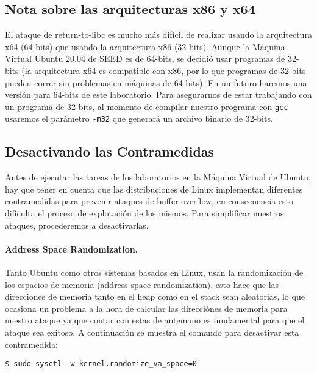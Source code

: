 \subsection{Nota sobre las arquitecturas x86 y x64}

El ataque de return-to-libc es mucho más difícil de realizar usando la arquitectura x64 (64-bits) que usando la arquitectura x86 (32-bits).
Aunque la Máquina Virtual Ubuntu 20.04 de SEED es de 64-bits, se decidió usar programas de 32-bits (la arquitectura x64 es compatible con x86, por lo que programas de 32-bits pueden correr sin problemas en máquinas de 64-bits). En un futuro haremos una versión para 64-bits de este laboratorio.
Para asegurarnos de estar trabajando con un programa de 32-bits, al momento de compilar nuestro programa con \texttt{gcc} usaremos el parámetro \texttt{-m32} que generará un archivo binario de 32-bits.



\subsection{Desactivando las Contramedidas}

Antes de ejecutar las tareas de los laboratorios en la Máquina Virtual de Ubuntu, hay que tener en cuenta que las distribuciones de Linux implementan diferentes contramedidas para prevenir ataques de buffer overflow, en consecuencia esto dificulta el proceso de explotación de los mismos.
Para simplificar nuestros ataques, procederemos a desactivarlas.


\paragraph{Address Space Randomization.}
Tanto Ubuntu como otros sistemas basados en Linux, usan la randomización de los espacios de memoria (address space randomization), esto hace que las direcciones de memoria tanto en el heap como en el stack sean aleatorias, lo que ocasiona un problema a la hora de calcular las direcciónes de memoria para nuestro ataque ya que contar con estas de antemano es fundamental para que el ataque sea exitoso. 
A continuación se muestra el comando para desactivar esta contramedida:

\begin{lstlisting}
$ sudo sysctl -w kernel.randomize_va_space=0
\end{lstlisting}


